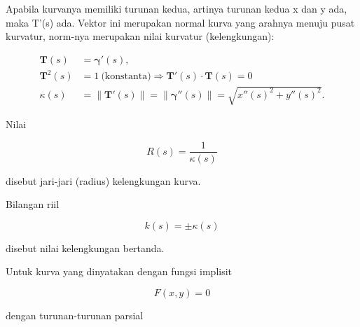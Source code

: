 \documentclass[a4paper,10pt]{article}
\begin{document}
\begin{eulernotebook}
\begin{eulercomment}
\begin{eulercomment}
\begin{eulercomment}
\begin{eulercomment}
\begin{eulercomment}
\begin{eulercomment}
\begin{eulercomment}
\begin{eulercomment}
\begin{eulercomment}
\begin{eulercomment}
\begin{eulercomment}
\begin{eulercomment}
\begin{eulercomment}
\begin{eulercomment}
\begin{eulercomment}
\begin{eulercomment}
\begin{eulercomment}
Apabila kurvanya memiliki turunan kedua, artinya turunan kedua x dan y
ada, maka T'(s) ada. Vektor ini merupakan normal kurva yang arahnya
menuju pusat kurvatur, norm-nya merupakan nilai kurvatur
(kelengkungan):

\end{eulercomment}
\begin{eulerformula}
\[
 \begin{aligned}\mathbf{T}(s) &= \mathbf{\gamma}'(s),\\ \mathbf{T}^{2}(s) &=1\ \text{(konstanta)}\Rightarrow \mathbf{T}'(s)\cdot \mathbf{T}(s)=0\\ \kappa(s) &=\|\mathbf {T}'(s)\|= \|\mathbf{\gamma}''(s)\|=\sqrt{x''(s)^{2}+y''(s)^{2}}.\end{aligned}
\]
\end{eulerformula}
\begin{eulercomment}
Nilai

\end{eulercomment}
\begin{eulerformula}
\[
R(s)=\frac{1}{\kappa(s)}
\]
\end{eulerformula}
\begin{eulercomment}
disebut jari-jari (radius) kelengkungan kurva.

Bilangan riil

\end{eulercomment}
\begin{eulerformula}
\[
 k(s) = \pm\kappa(s)
\]
\end{eulerformula}
\begin{eulercomment}
disebut nilai kelengkungan bertanda.


Untuk kurva yang dinyatakan dengan fungsi implisit

\end{eulercomment}
\begin{eulerformula}
\[
F(x,y)=0
\]
\end{eulerformula}
\begin{eulercomment}
dengan turunan-turunan parsial


\end{eulercomment}
\end{eulercomment}
\end{eulercomment}
\end{eulercomment}
\end{eulercomment}
\end{eulercomment}
\end{eulercomment}
\end{eulercomment}
\end{eulercomment}
\end{eulercomment}
\end{eulercomment}
\end{eulercomment}
\end{eulercomment}
\end{eulercomment}
\end{eulercomment}
\end{eulercomment}
\end{eulercomment}
\end{eulernotebook}
\end{document}
